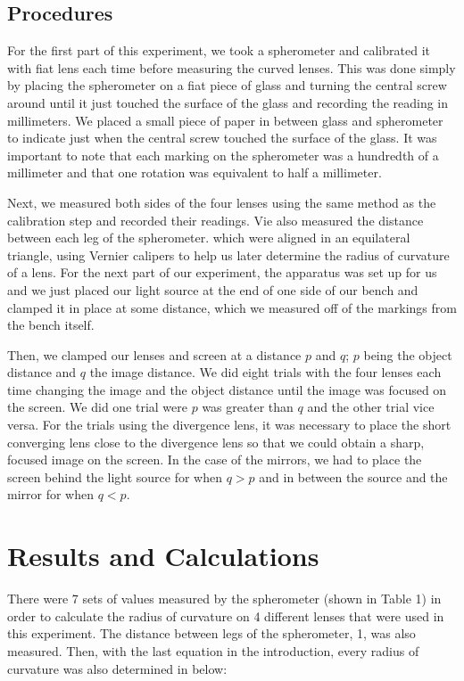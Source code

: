 \documentclass[12pt]{article}
\begin{document}
\begin{multicols}{2}
\section*{Procedures} 
For the first part of this experiment, we took a spherometer and calibrated it with fiat lens each time before measuring the curved lenses. This was done simply by placing the spherometer on a fiat piece of glass and turning the central screw around until it just touched the surface of the glass and recording the reading in millimeters. We placed a small piece of paper in between glass and spherometer to indicate just when the central screw touched the surface of the glass. It was important to note that each marking on the spherometer was a hundredth of a millimeter and that one rotation was equivalent to half a millimeter.

Next, we measured both sides of the four lenses using the same method as the calibration step and recorded their readings. Vie also measured the distance between each leg of the spherometer. which were aligned in an equilateral triangle, using Vernier calipers to help us later determine the radius of curvature of a lens. For the next part of our experiment, the apparatus was set up for us and we just placed our light source at the end of one side of our bench and clamped it in place at some distance, which we measured off of the markings from the bench itself. 

Then, we clamped our lenses and screen at a distance $p$ and $q$; $p$ being the object distance and $q$ the image distance. We did eight trials with the four lenses each time changing the image and the object distance until the image was focused on the screen. We did one trial were $p$ was greater than $q$ and the other trial vice versa. For the trials using the divergence lens, it was necessary to place the short converging lens close to the divergence lens so that we could obtain a sharp, focused image on the screen. In the case of the mirrors, we had to place the screen behind the light source for when $q > p$ and in between the source and the mirror for when $q < p$.
\par 

	\end{multicols}

\section*{Results and Calculations}\label{sec:RnD}
There were 7 sets of values measured by the spherometer (shown in Table 1) in order to calculate the radius of curvature on 4 different lenses that were used in this experiment. The distance between legs of the spherometer, 1, was also measured. Then, with the last equation in the introduction, every radius of curvature was also determined in below:
\end{document}
